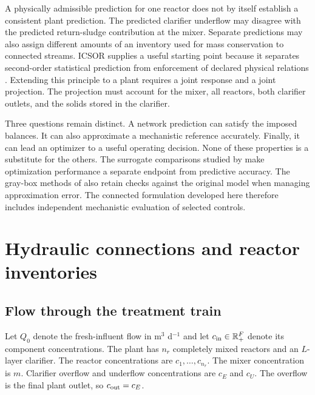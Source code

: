 A physically admissible prediction for one reactor does not by itself establish a consistent plant prediction. The predicted clarifier underflow may disagree with the predicted return-sludge contribution at the mixer. Separate predictions may also assign different amounts of an inventory used for mass conservation to connected streams. ICSOR supplies a useful starting point because it separates second-order statistical prediction from enforcement of declared physical relations \citep{Selerio2026}. Extending this principle to a plant requires a joint response and a joint projection. The projection must account for the mixer, all reactors, both clarifier outlets, and the solids stored in the clarifier.

Three questions remain distinct. A network prediction can satisfy the imposed balances. It can also approximate a mechanistic reference accurately. Finally, it can lead an optimizer to a useful operating decision. None of these properties is a substitute for the others. The surrogate comparisons studied by \citet{Pedrozo2025} make optimization performance a separate endpoint from predictive accuracy. The gray-box methods of \citet{Hameed2026} also retain checks against the original model when managing approximation error. The connected formulation developed here therefore includes independent mechanistic evaluation of selected controls.

\section{Hydraulic connections and reactor inventories}

\subsection{Flow through the treatment train}

Let $Q_0$ denote the fresh-influent flow in m$^3$ d$^{-1}$ and let $c_{\rm in}\in\mathbb R_+^F$ denote its component concentrations. The plant has $n_r$ completely mixed reactors and an $L$-layer clarifier. The reactor concentrations are $c_1,\ldots,c_{n_r}$. The mixer concentration is $m$. Clarifier overflow and underflow concentrations are $c_E$ and $c_U$. The overflow is the final plant outlet, so $c_{\rm out}=c_E$.

